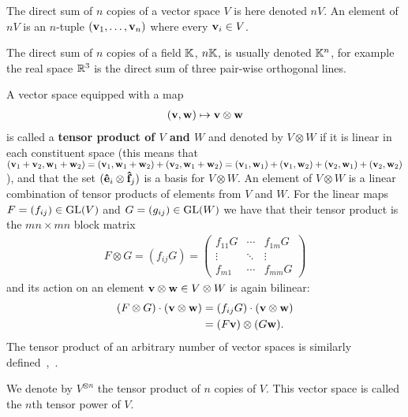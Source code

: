 \begin{notation}
	The direct sum of $n$ copies of a vector space $V$ is here denoted $nV$.  An element of $nV$ is an $n$-tuple $(\mathbf{v}_1, \dots, \mathbf{v}_n)$ where every $\mathbf{v}_i \in V$.
\end{notation}

\begin{example}
	The direct sum of $n$ copies of a field $\mathbb{K}$, $n\mathbb{K}$, is usually denoted $\mathbb{K}^n$, for example the real space $\mathbb{R}^3$ is the direct sum of three pair-wise orthogonal lines.
\end{example}

A vector space equipped with a map
\begin{align*}
	(\mathbf{v}, \mathbf{w}) \mapsto \mathbf{v} \otimes \mathbf{w}
\end{align*}
is called a \textbf{tensor product of $V$ and $W$} and denoted by $V \otimes W$ if it is linear in each constituent space (this means that $(\mathbf{v}_1 + \mathbf{v}_2, \mathbf{w}_1 + \mathbf{w}_2) =  (\mathbf{v}_1, \mathbf{w}_1 + \mathbf{w}_2) + (\mathbf{v}_2, \mathbf{w}_1 + \mathbf{w}_2) = (\mathbf{v}_1, \mathbf{w}_1) + (\mathbf{v}_1, \mathbf{w}_2) + (\mathbf{v}_2, \mathbf{w}_1) + (\mathbf{v}_2, \mathbf{w}_2)$), and that the set $(\mathbf{\hat{e}}_i \otimes \mathbf{\hat{f}}_j)$ is a basis for $V \otimes W$. An element of $V \otimes W$ is a linear combination of tensor products of elements from $V$ and $W$. For the linear maps $F=(f_{ij}) \in \text{GL}(V)$ and $G=(g_{ij}) \in \text{GL}(W)$ we have that their tensor product is the $mn \times mn$ block matrix
\begin{align*}
		F \otimes G = (f_{ij}G) = \begin{pmatrix}
				f_{11}G & \cdots & f_{1m}G  \\
				\vdots & \ddots & \vdots \\
				f_{m1} & \cdots & f_{mm}G
			\end{pmatrix}
	\end{align*}
and its action on an element $\mathbf{v} \otimes \mathbf{w} \in V \otimes W$ is again bilinear:
\begin{align*}
		(F \otimes G) \cdot (\mathbf{v} \otimes \mathbf{w}) &= (f_{ij}G)  \cdot (\mathbf{v} \otimes \mathbf{w})  \\
		&= (F\mathbf{v}) \otimes (G\mathbf{w}).
	\end{align*} The tensor product of an arbitrary number of vector spaces is similarly defined~\cite[Sect.1.5.]{Serre},~\cite[Sect.1.7.]{Sagan}.
	
\begin{notation}
	We denote by $V^{\otimes n}$ the tensor product of $n$ copies of $V$. This vector space is called the $n$th tensor power of $V$.
\end{notation}

